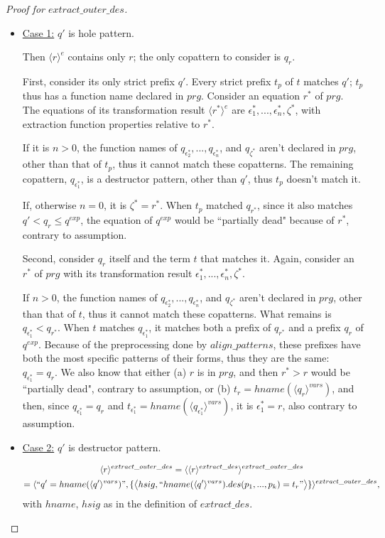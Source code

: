 \documentclass[11pt]{article} %
\begin{document}
\begin{proof}[Proof for $extract\_outer\_des$]
\begin{itemize}
\begin{itemize}
\item \underline{Case 1:} $q'$ is hole pattern.

Then $\langle r \rangle^e$ contains only $r$; the only copattern to consider is $q_r$.

First, consider its only strict prefix $q'$. Every strict prefix $t_p$ of $t$ matches $q'$; $t_p$ thus has a function name declared in $prg$. Consider an equation $r^*$ of $prg$. The equations of its transformation result $\langle r^* \rangle^e$ are $\epsilon^*_1, ..., \epsilon^*_n, \zeta^*$, with extraction function properties relative to $r^*$.

If it is $n > 0$, the function names of $q_{\epsilon^*_2}, ..., q_{\epsilon^*_n}$, and $q_{\zeta^*}$ aren't declared in $prg$, other than that of $t_p$, thus it cannot match these copatterns. The remaining copattern, $q_{\epsilon^*_1}$, is a destructor pattern, other than $q'$, thus $t_p$ doesn't match it.

If, otherwise $n = 0$, it is $\zeta^* = r^*$. When $t_p$ matched $q_{r^*}$, since it also matches $q' < q_r \leq q^{exp}$, the equation of $q^{exp}$ would be ``partially dead" because of $r^*$, contrary to assumption.

Second, consider $q_r$ itself and the term $t$ that matches it. Again, consider an $r^*$ of $prg$ with its transformation result $\epsilon^*_1, ..., \epsilon^*_n, \zeta^*$.

If $n > 0$, the function names of $q_{\epsilon^*_2}, ..., q_{\epsilon^*_n}$, and $q_{\zeta^*}$ aren't declared in $prg$, other than that of $t$, thus it cannot match these copatterns. What remains is $q_{\epsilon^*_1} < q_{r^*}$. When $t$ matches $q_{\epsilon^*_1}$, it matches both a prefix of $q_{r^*}$ and a prefix $q_r$ of $q^{exp}$. Because of the preprocessing done by $align\_patterns$, these prefixes have both the most specific patterns of their forms, thus they are the same: $q_{\epsilon^*_1} = q_r$. We also know that either (a) $r$ is in $prg$, and then $r^* > r$ would be ``partially dead", contrary to assumption, or (b) $t_r = hname(\langle q_r \rangle^{vars})$, and then, since $q_{\epsilon^*_1} = q_r$ and $t_{\epsilon^*_1} = hname(\langle q_{\epsilon^*_1} \rangle^{vars})$, it is $\epsilon^*_1 = r$, also contrary to assumption.

\item \underline{Case 2:} $q'$ is destructor pattern.

\begin{multline*}
\langle r \rangle^{extract\_outer\_des} = \langle \langle r \rangle^{extract\_des} \rangle^{extract\_outer\_des}\\
= \langle `` q' = hname(\langle q' \rangle^{vars}) ", \{\big\langle hsig, `` hname(\langle q' \rangle^{vars}).des(p_1, ..., p_k) = t_r " \big\rangle \} \rangle^{extract\_outer\_des},
\end{multline*}
with $hname$, $hsig$ as in the definition of $extract\_des$.


\end{itemize}
\end{itemize}
\end{proof}
\end{document}

